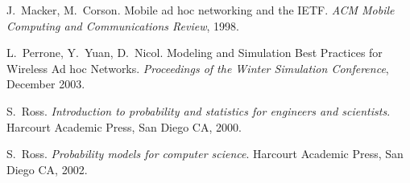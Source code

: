 \begin{thebibliography}{99}
J.~Macker, M.~Corson.
Mobile ad hoc networking and the IETF.
\textit{ACM Mobile Computing and Communications Review}, 1998.

L.~Perrone, Y.~Yuan, D.~Nicol.
Modeling and Simulation Best Practices for Wireless Ad hoc Networks.
\textit{Proceedings of the Winter Simulation Conference}, December 2003.








S.~Ross.
\textit{Introduction to probability and statistics for engineers and scientists}.
Harcourt Academic Press, San Diego CA, 2000.


S.~Ross.
\textit{Probability models for computer science}.
Harcourt Academic Press, San Diego CA, 2002.




\end{thebibliography}
